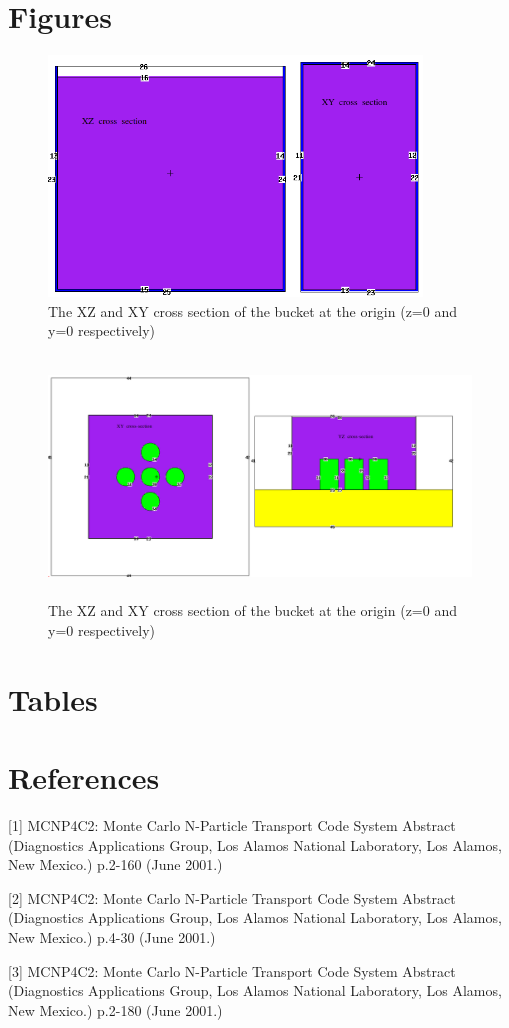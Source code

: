 \documentclass[a4paper, 12pt]{article}
\begin{document}
\begin{appendices}

\section{Figures}
\begin{figure}[H]
\centering
\includegraphics[height=6.4cm]{Ex1CrxSx.png}
\caption{The XZ and XY cross section of the bucket at the origin (z=0 and y=0 respectively)
}\label{Ex1CrxSx}
\end{figure}

\begin{figure}[H]
\centering
\includegraphics[height=6.4cm]{Ex3CrxSx.png}
\caption{The XZ and XY cross section of the bucket at the origin (z=0 and y=0 respectively)
}\label{Ex3CrxSx}
\end{figure}

\section{Tables}

\section{References}
\indent

[1] MCNP4C2: Monte Carlo N-Particle Transport Code System Abstract (Diagnostics Applications Group, Los Alamos National Laboratory, Los Alamos, New Mexico.) p.2-160 (June 2001.)

[2] MCNP4C2: Monte Carlo N-Particle Transport Code System Abstract (Diagnostics Applications Group, Los Alamos National Laboratory, Los Alamos, New Mexico.) p.4-30 (June 2001.)

[3] MCNP4C2: Monte Carlo N-Particle Transport Code System Abstract (Diagnostics Applications Group, Los Alamos National Laboratory, Los Alamos, New Mexico.) p.2-180 (June 2001.)

\end{appendices}
\end{document}
